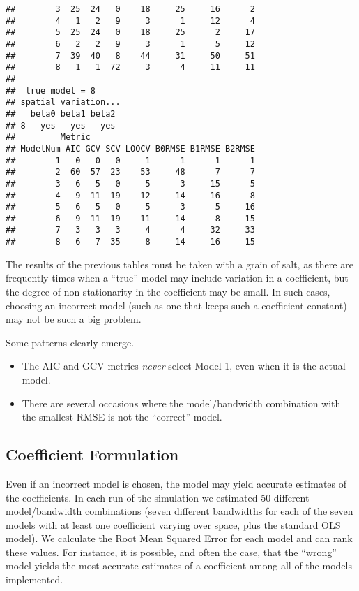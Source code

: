 \documentclass{article}\usepackage[]{graphicx}\usepackage[]{color}
\makeatletter
\newenvironment{kframe}{%
 \def\at@end@of@kframe{}%
 \ifinner\ifhmode%
  \def\at@end@of@kframe{\end{minipage}}%
  \begin{minipage}{\columnwidth}%
 \fi\fi%
 \def\FrameCommand##1{\hskip\@totalleftmargin \hskip-\fboxsep
 \colorbox{shadecolor}{##1}\hskip-\fboxsep
     \hskip-\linewidth \hskip-\@totalleftmargin \hskip\columnwidth}%
 \MakeFramed {\advance\hsize-\width
   \@totalleftmargin\z@ \linewidth\hsize
   \@setminipage}}%
 {\par\unskip\endMakeFramed%
 \at@end@of@kframe}
\newenvironment{knitrout}{}{} %
\makeatother
\begin{document}
\begin{knitrout}
\begin{kframe}
\begin{verbatim}
##        3  25  24   0    18     25     16      2
##        4   1   2   9     3      1     12      4
##        5  25  24   0    18     25      2     17
##        6   2   2   9     3      1      5     12
##        7  39  40   8    44     31     50     51
##        8   1   1  72     3      4     11     11
## 
##  true model = 8 
## spatial variation...
##   beta0 beta1 beta2
## 8   yes   yes   yes
##         Metric
## ModelNum AIC GCV SCV LOOCV B0RMSE B1RMSE B2RMSE
##        1   0   0   0     1      1      1      1
##        2  60  57  23    53     48      7      7
##        3   6   5   0     5      3     15      5
##        4   9  11  19    12     14     16      8
##        5   6   5   0     5      3      5     16
##        6   9  11  19    11     14      8     15
##        7   3   3   3     4      4     32     33
##        8   6   7  35     8     14     16     15
\end{verbatim}
\end{kframe}
\end{knitrout}


The results of the previous tables must be taken with a grain of salt, as there are frequently times when a ``true'' model may include variation in a coefficient, but the degree of non-stationarity in the coefficient may be small. In such cases, choosing an incorrect model (such as one that keeps such a coefficient constant) may not be such a big problem. 

Some patterns clearly emerge. 
\begin{itemize}
\item The AIC and GCV metrics \emph{never} select Model 1, even when it is the actual model.
\item There are several occasions where the model/bandwidth combination with the smallest RMSE is not the ``correct'' model.
\end{itemize}

\subsection{Coefficient Formulation}

Even if an incorrect model is chosen, the model may yield accurate estimates of the coefficients. In each run of the simulation we estimated 50 different model/bandwidth combinations (seven different bandwidths for each of the seven models with at least one coefficient varying over space, plus the standard OLS model). We calculate the Root Mean Squared Error for each model and can rank these values. For instance, it is possible, and often the case, that the ``wrong'' model yields the most accurate estimates of a coefficient among all of the models implemented.
\end{document}

